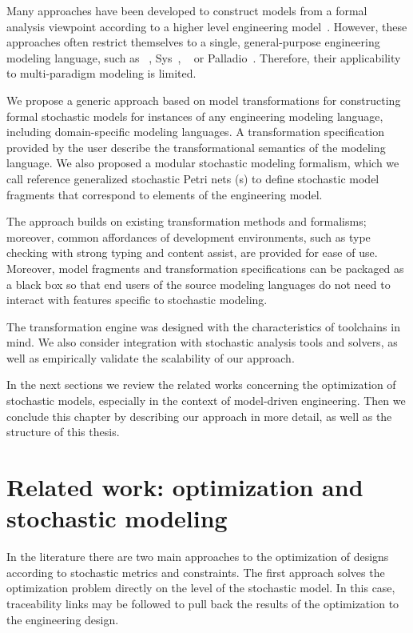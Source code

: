 Many approaches have been developed to construct models from a formal analysis viewpoint according to a higher level engineering model~. However, these approaches often restrict themselves to a single, general-purpose engineering modeling language, such as ~\citep{Rumbaugh04uml}, Sys~\citep{Friedenthal16sysml}, ~\citep{Feiler12aadl} or Palladio~\citep{Becker08palladio}. Therefore, their applicability to multi-paradigm modeling is limited.

We propose a generic approach based on model transformations for constructing formal stochastic models for instances of any engineering modeling language, including domain-specific modeling languages. A transformation specification provided by the user describe the transformational semantics of the modeling language. We also proposed a modular stochastic modeling formalism, which we call reference generalized stochastic Petri nets (s) to define stochastic model fragments that correspond to elements of the engineering model.

The approach builds on existing transformation methods and formalisms; moreover, common affordances of development environments, such as type checking with strong typing and content assist, are provided for ease of use. Moreover, model fragments and transformation specifications can be packaged as a black box so that end users of the source modeling languages do not need to interact with features specific to stochastic modeling.

The transformation engine was designed with the characteristics of  toolchains in mind. We also consider integration with stochastic analysis tools and solvers, as well as empirically validate the scalability of our approach.

In the next sections we review the related works concerning the optimization of stochastic models, especially in the context of model-driven engineering. Then we conclude this chapter by describing our approach in more detail, as well as the structure of this thesis.

\section{Related work: optimization and stochastic modeling}
\label{sec:intro:relwork}

In the literature there are two main approaches to the optimization of designs according to stochastic metrics and constraints. The first approach solves the optimization problem directly on the level of the stochastic model. In this case, traceability links may be followed to pull back the results of the optimization to the engineering design.

